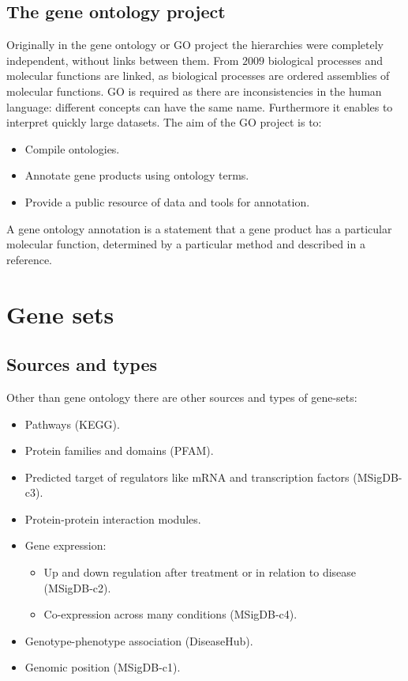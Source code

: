 	\subsection{The gene ontology project}
	Originally in the gene ontology or GO project the hierarchies were completely independent, without links between them.
	From $2009$ biological processes and molecular functions are linked, as biological processes are ordered assemblies of molecular functions.
	GO is required as there are inconsistencies in the human language: different concepts can have the same name.
	Furthermore it enables to interpret quickly large datasets.
	The aim of the GO project is to:

	\begin{multicols}{3}
		\begin{itemize}
			\item Compile ontologies.
			\item Annotate gene products using ontology terms.
			\item Provide a public resource of data and tools for annotation.
		\end{itemize}
	\end{multicols}

	A gene ontology annotation is a statement that a gene product has a particular molecular function, determined by a particular method and described in a reference.

\section{Gene sets}

	\subsection{Sources and types}
	Other than gene ontology there are other sources and types of gene-sets:

	\begin{multicols}{2}
		\begin{itemize}
			\item Pathways (KEGG).
			\item Protein families and domains (PFAM).
			\item Predicted target of regulators like mRNA and transcription factors (MSigDB-c3).
			\item Protein-protein interaction modules.
			\item Gene expression:

				\begin{itemize}
					\item Up and down regulation after treatment or in relation to disease (MSigDB-c2).
					\item Co-expression across many conditions (MSigDB-c4).
				\end{itemize}

			\item Genotype-phenotype association (DiseaseHub).
			\item Genomic position (MSigDB-c1).
		\end{itemize}
	\end{multicols}

